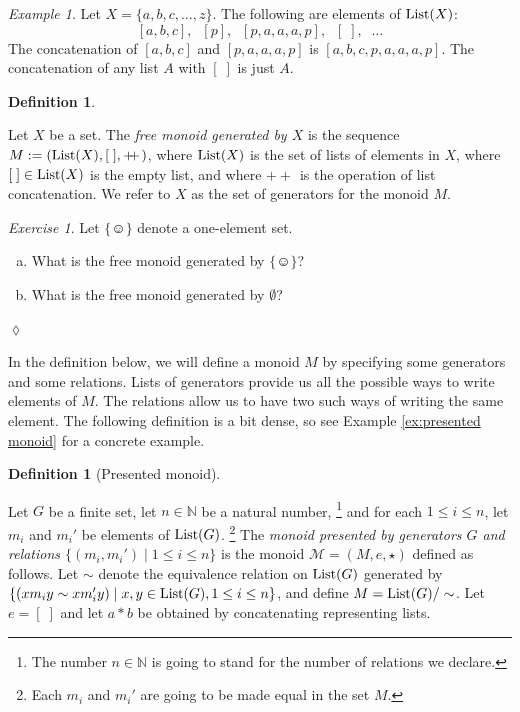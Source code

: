 \documentclass{book}
\def\tn{\textnormal}
\def\mc{\mathcal}
\def\NN{{\mathbb N}}
\def\List{\tn{List}}
\def\singleton{\{\smiley\}}
\def\|{{\;|\;}}
\def\plpl{+\!\!+\hspace{1pt}}
\def\mcM{\mc{M}}
\theoremstyle{remark}
\newtheorem{example}[subsubsection]{Example}
\newtheorem{exc}[subsubsection]{Exercise}
\newenvironment{exercise}{\begin{exc}}{\hspace*{\fill}$\lozenge$\end{exc}}
\theoremstyle{definition}
\newtheorem{definition}[subsubsection]{Definition}
\def\sexc{\begin{enumerate}[a.)]\setlength{\itemsep}{.1cm}\setlength{\parskip}{.1cm}\item}
\def\next{\item}
\def\endsexc{\end{enumerate}}
\begin{document}
\begin{example}

Let $X=\{a,b,c,\ldots,z\}$. The following are elements of $\List(X)$: $$[a,b,c],\;\; [p],\;\; [p,a,a,a,p],\;\; [\;],\;\;\dots$$ The concatenation of $[a,b,c]$ and $[p,a,a,a,p]$ is $[a,b,c,p,a,a,a,p]$. The concatenation of any list $A$ with $[\;]$ is just $A$.

\end{example}

\begin{definition}\label{def:free monoid}

Let $X$ be a set. The {\em free monoid generated by $X$} is the sequence $M:=(\List(X),[\;],\plpl)$, where $\List(X)$ is the set of lists of elements in $X$, where $[\;]\in\List(X)$ is the empty list, and where $\plpl$ is the operation of list concatenation. We refer to $X$ as the set of generators for the monoid $M$.

\end{definition}

\begin{exercise}
Let $\singleton$ denote a one-element set. 
\sexc What is the free monoid generated by $\singleton$? 
\next What is the free monoid generated by $\emptyset$?
\endsexc
\end{exercise}

In the definition below, we will define a monoid $M$  by specifying some generators and some relations. Lists of generators provide us all the possible ways to write elements of $M$. The relations allow us to have two such ways of writing the same element. The following definition is a bit dense, so see Example \ref{ex:presented monoid} for a concrete example.

\begin{definition}[Presented monoid]\label{def:presented monoid}

Let $G$ be a finite set, let $n\in\NN$ be a natural number,
\footnote{The number $n\in\NN$ is going to stand for the number of relations we declare.} 
and for each $1\leq i\leq n$, let $m_i$ and $m_i'$ be elements of $\List(G)$.
\footnote{Each $m_i$ and $m_i'$ are going to be made equal in the set $M$.} 
The {\em monoid presented by generators $G$ and relations $\{(m_i,m_i')\|1\leq i\leq n\}$} is the monoid $\mcM=(M,e,\star)$ defined as follows. Let $\sim$ denote the equivalence relation on $\List(G)$ generated by $\{(xm_iy\sim xm_i'y)\|x,y\in\List(G), 1\leq i\leq n\}$, and define $M=\List(G)/\sim$. Let $e=[\;]$ and let $a * b$ be obtained by concatenating representing lists. 

\end{definition}
\end{document}
